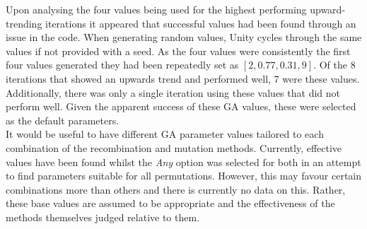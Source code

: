 \documentclass{article}
\begin{document}
Upon analysing the four values being used for the highest performing upward-trending iterations it appeared that successful values had been found through an issue in the code. When generating random values, Unity cycles through the same values if not provided with a seed.  As the four values were consistently the first four values generated they had been repeatedly set as $[2, 0.77, 0.31, 9]$. Of the 8 iterations that showed an upwards trend and performed well, 7 were these values. Additionally, there was only a single iteration using these values that did not perform well. Given the apparent success of these GA values, these were selected as the default parameters. \\
It would be useful to have different GA parameter values tailored to each combination of the recombination and mutation methods. Currently, effective values have been found whilst the \textit{Any} option was selected for both in an attempt to find parameters suitable for all permutations. However, this may favour certain combinations more than others and there is currently no data on this. Rather, these base values are assumed to be appropriate and the effectiveness of the methods themselves judged relative to them. \\
\end{document}

